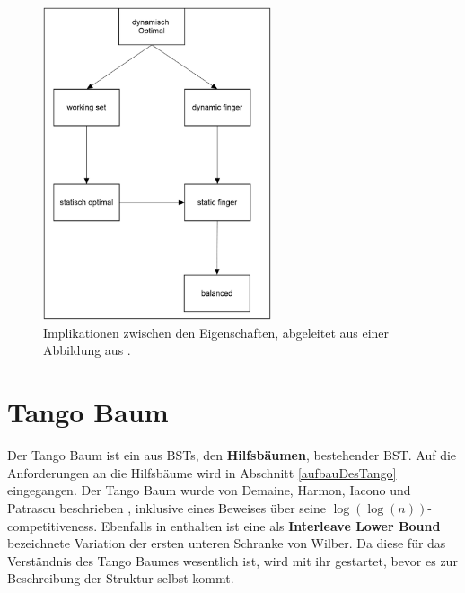 \documentclass[a4paper,12pt]{article}
\begin{document}
\begin{figure}[H]
	\centering
	\includegraphics[width= 0.6\textwidth]{Medien/DynOpt/upperBounds}
	\caption{Implikationen zwischen den Eigenschaften, abgeleitet aus einer Abbildung aus \cite{upperBounds}. }
	\label{fig:upperBounds}
\end{figure}


\section{Tango Baum} \label{TangoAbschnitt}
Der Tango Baum ist ein aus BSTs, den \textbf{Hilfsbäumen}, bestehender BST. Auf die Anforderungen an die Hilfsbäume wird in Abschnitt \ref{aufbauDesTango} eingegangen. Der Tango Baum wurde  von Demaine, Harmon, Iacono und Patrascu beschrieben \cite{demainDinamicOpti}, inklusive eines Beweises über seine $\log\left(\log\left(n\right)\right)$-competitiveness. Ebenfalls in \cite{demainDinamicOpti} enthalten ist eine als \textbf{Interleave Lower Bound} bezeichnete Variation der ersten unteren Schranke von Wilber. Da diese für das Verständnis des Tango Baumes wesentlich ist, wird mit ihr gestartet, bevor es zur Beschreibung der Struktur selbst kommt. 
\end{document}
